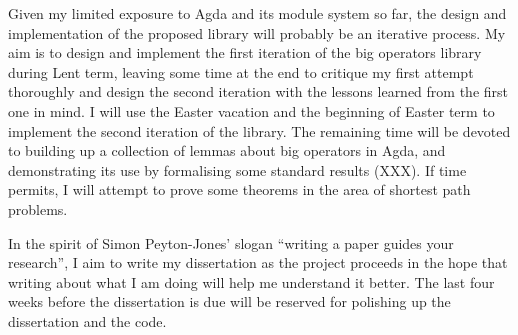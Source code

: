 \documentclass[a4paper]{scrartcl}
\begin{document}
Given my limited exposure to Agda and its module system so far, the design and implementation of the proposed library will probably be an iterative process. My aim is to design and implement the first iteration of the big operators library during Lent term, leaving some time at the end to critique my first attempt thoroughly and design the second iteration with the lessons learned from the first one in mind. I will use the Easter vacation and the beginning of Easter term to implement the second iteration of the library. The remaining time will be devoted to building up a collection of lemmas about big operators in Agda, and demonstrating its use by formalising some standard results (XXX). If time permits, I will attempt to prove some theorems in the area of shortest path problems.

In the spirit of Simon Peyton-Jones' slogan \enquote{writing a paper guides your research}, I aim to write my dissertation as the project proceeds in the hope that writing about what I am doing will help me understand it better. The last four weeks before the dissertation is due will be reserved for polishing up the dissertation and the code.

\printbibliography
\end{document}
